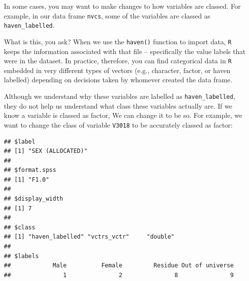\documentclass[
]{book}
\newenvironment{Shaded}{\begin{snugshade}}{\end{snugshade}}
\newcommand{\AttributeTok}[1]{\textcolor[rgb]{0.77,0.63,0.00}{#1}}
\newcommand{\CommentTok}[1]{\textcolor[rgb]{0.56,0.35,0.01}{\textit{#1}}}
\newcommand{\FunctionTok}[1]{\textcolor[rgb]{0.00,0.00,0.00}{#1}}
\newcommand{\NormalTok}[1]{#1}
\newcommand{\OtherTok}[1]{\textcolor[rgb]{0.56,0.35,0.01}{#1}}
\newcommand{\SpecialCharTok}[1]{\textcolor[rgb]{0.00,0.00,0.00}{#1}}
\newcommand{\StringTok}[1]{\textcolor[rgb]{0.31,0.60,0.02}{#1}}
\begin{document}
In some cases, you may want to make changes to how variables are classed. For example, in our data frame \texttt{nvcs}, some of the variables are classed as \texttt{haven\_labelled}.

What is this, you ask? When we use the \texttt{haven()} function to import data, \texttt{R} keeps the information associated with that file -- specifically the value labels that were in the dataset. In practice, therefore, you can find categorical data in \texttt{R} embedded in very different types of vectors (e.g., character, factor, or haven labelled) depending on decisions taken by whomever created the data frame.

Although we understand why these variables are labelled as \texttt{haven\_labelled}, they do not help us understand what class these variables actually are. If we know a variable is classed as factor, We can change it to be so. For example, we want to change the class of variable \texttt{V3018} to be accurately classed as factor:

\begin{Shaded}
\end{Shaded}

\begin{verbatim}
## $label
## [1] "SEX (ALLOCATED)"
## 
## $format.spss
## [1] "F1.0"
## 
## $display_width
## [1] 7
## 
## $class
## [1] "haven_labelled" "vctrs_vctr"     "double"        
## 
## $labels
##            Male          Female         Residue Out of universe 
##               1               2               8               9
\end{verbatim}

\begin{Shaded}
\end{Shaded}
\end{document}
